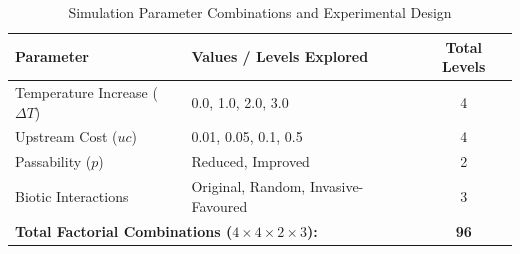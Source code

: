 \documentclass[11pt,a4paper]{article}
\begin{document}
\begin{table}[h!]
\centering
\caption{Simulation Parameter Combinations and Experimental Design}
\label{tab:parameter_combinations}
\begin{tabular}{llc}
\toprule
\textbf{Parameter} & \textbf{Values / Levels Explored} & \textbf{Total Levels} \\
\midrule
Temperature Increase ($\Delta T$) & 0.0, 1.0, 2.0, 3.0 & 4 \\
Upstream Cost ($uc$)              & 0.01, 0.05, 0.1, 0.5 & 4 \\
Passability ($p$)                 & Reduced, Improved & 2 \\
Biotic Interactions               & Original, Random, Invasive-Favoured & 3 \\
\midrule
\multicolumn{2}{l}{\textbf{Total Factorial Combinations ($4 \times 4 \times 2 \times 3$):}} & \textbf{96} \\
\bottomrule
\end{tabular}
\end{table}
\end{document}

